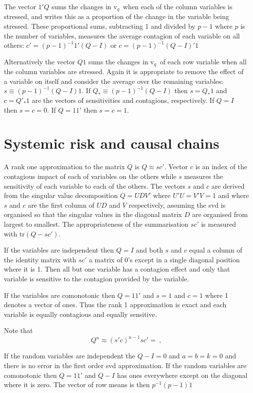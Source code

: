 \documentclass[authoryear]{elsarticle}
\newcommand{\tr}{\mathrm{tr}}
\renewcommand{\v}{\ensuremath{\mathrm{v}_q}}
\begin{document}
The vector $1'Q$ sums  the changes in \v\ when each of the column variables is stressed, and writes this as a proportion of the change in the variable being stressed.   These proportional sums, subtracting 1 and divided by  $p-1$ where $p$ is the number of variables, measures the average contagion of each variable on all others:  $c'=(p-1)^{-1}1'(Q-I)$ or $c=(p-1)^{-1}(Q-I)'1$

Alternatively the vector $Q1$ sums the changes in \v\ of each row variable when all the column variables are stressed.   Again it is appropriate to remove the effect of a variable on itself and consider the average over the remaining variables:  $s\equiv(p-1)^{-1}(Q-I)1$.  If $Q_*\equiv (p-1)^{-1}(Q-I)$ then $s=Q_*1$ and $c=Q'_*1$ are the vectors of sensitivities and contagions, respectively.  If $Q=I$ then $s=c=0$.   If $Q=11'$ then $s=c=1$.


 
 \section{Systemic risk and causal chains}
A rank one approximation to the matrix  $Q$ is 
 $
 Q  \approx  sc' 
 $.
 Vector $c$ is an index of the contagious  impact of each of variables on the others while $s$ measures the sensitivity of each variable to each of the others.  The vectors $s$ and $c$ are derived from the singular value decomposition $Q=UDV'$ where $U'U=V'V=1$  and  where $s$ and $c$ are the first column of $UD$ and $V$  respectively, assuming the svd is organised so that the singular values in the diagonal matrix $D$ are organised from largest to smallest.   The appropriateness of the summarisation $sc'$ is measured with $\tr(Q-sc')$.
 
If the variables are independent then $Q=I$ and both $s$ and $c$ equal a column of the identity matrix with $sc'$ a matrix of 0's except in a single diagonal position where it is 1.   Then all but one variable has a contagion effect and only that variable is sensitive to the contagion provided by the  variable.

If the variables are comonotonic then $Q=11'$ and $s=1$ and $c=1$ where 1 denotes a vector of ones.   Thus the rank 1 approximation is exact and each variable is equally contagious and equally sensitive.
 
 Note that 
 $$
 Q^{n} \approx (s'c)^{n-1}sc'=\ ,
 $$
 
 
 If the random variables are independent the $Q-I=0$ and $a=b=k=0$ and there is no error in the first order svd approximation.    If the random variables are comonotonic then $Q=11'$ and $Q-I$ has ones everywhere except on the diagonal where it is zero.   The vector of row means is then $p^{-1}(p-1)1$
 
\end{document}
